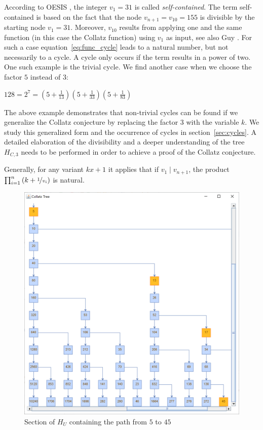 According to OESIS \cite{Ref_OESIS}, the integer $v_1=31$ is called \textit{self-contained}. The term self-contained is based on the fact that the node $v_{n+1}=v_{10}=155$ is divisible by the starting node $v_1=31$. Moreover, $v_{10}$ results from applying one and the same function (in this case the Collatz function) using $v_1$ as input, see also Guy \cite[p.~332]{Ref_Guy}. For such a case equation~\ref{eq:func_cycle} leads to a natural number, but not necessarily to a cycle. A cycle only occurs if the term results in a power of two. One such example is the trivial cycle. We find another case when we choose the factor $5$ instead of $3$:
\begin{center}
	$128=2^7=\left(5+\frac{1}{13}\right)\left(5+\frac{1}{33}\right)
	\left(5+\frac{1}{83}\right)$
\end{center}

The above example demonstrates that non-trivial cycles can be found if we generalize the Collatz conjecture by replacing the factor $3$ with the variable $k$. We study this generalized form and the occurrence of cycles in section~\ref{sec:cycles}. A detailed elaboration of the divisibility and a deeper understanding of the tree $H_{C,3}$ needs to be performed in order to achieve a proof of the Collatz conjecture.

Generally, for any variant $kx+1$ it applies that if $v_1\mid v_{n+1}$, the product $\prod_{i=1}^n\left(k+\nicefrac{1}{v_i}\right)$ is natural.

\newpage

\begin{figure}[H]
	\includegraphics[width=1.00\textwidth]{figures/h_u.png}
	\caption{Section of $H_U$ containing the path from $5$ to $45$}
	\label{fig:3}
\end{figure}

